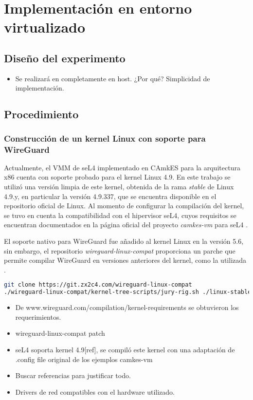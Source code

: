 \chapter{Implementación en entorno virtualizado} %
\section{Diseño del experimento}
\begin{itemize}
    \item Se realizará en completamente en host. ¿Por qué? Simplicidad de implementación.
\end{itemize}
\section{Procedimiento} %
  
\subsection{Construcción de un kernel Linux con soporte para WireGuard}
Actualmente, el VMM de seL4 implementado en CAmkES para la arquitectura x86 cuenta con soporte probado para el kernel Linux 4.9. En este trabajo se utilizó una versión limpia de este kernel, obtenida de la rama \textit{stable} de Linux 4.9.y, en particular la versión 4.9.337, que se encuentra disponible en el repositorio oficial de Linux. Al momento de configurar la compilación del kernel, se tuvo en cuenta la compatibilidad con el hipervisor seL4, cuyos requisitos se encuentran documentados en la página oficial del proyecto \textit{camkes-vm} para seL4 \cite{camkes_vm}.

El soporte nativo para WireGuard fue añadido al kernel Linux en la versión 5.6, sin embargo, el repositorio \textit{wireguard-linux-compat} proporciona un parche que permite compilar WireGuard en versiones anteriores del kernel, como la utilizada \cite{wireguard-compilation}.

\begin{lstlisting}[language=bash, caption={Parche wireguard-linux-compat para kernel 4.9}]
git clone https://git.zx2c4.com/wireguard-linux-compat
./wireguard-linux-compat/kernel-tree-scripts/jury-rig.sh ./linux-stable
\end{lstlisting}

\begin{itemize}
    \item De www.wireguard.com/compilation/kernel-requirements se obtuvieron los requerimientos.
    \item wireguard-linux-compat patch
    \item seL4 soporta kernel 4.9[ref], se compiló este kernel con una adaptación de .config file original de los ejemplos camkes-vm
    \item Buscar referencias para justificar todo. \cite{Laricch2009AAMOP_ICBp3}

    \item Drivers de red compatibles con el hardware utilizado.
\end{itemize}

